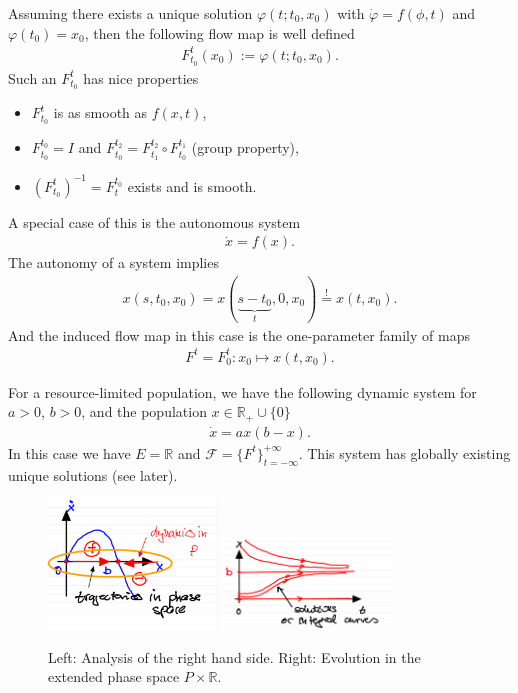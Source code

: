 \begin{enumerate}
	Assuming there exists a unique solution $\varphi(t; t_0, x_0)$ with $\dot{\varphi} = f(\phi,t)$ and $\varphi(t_0)= x_0$, then the following flow map is well defined
	\begin{align}
		\boxed{
		F_{t_0}^{t}(x_0) := \varphi(t; t_0, x_0).}
	\end{align}
	Such an $F_{t_0}^{t}$ has nice properties
	\begin{itemize}
		\item $F_{t_0}^{t}$ is as smooth as $f(x,t)$,
		\item $F_{t_0}^{t_0} = I$ and $F_{t_0}^{t_2} = F_{t_1}^{t_2} \circ F_{t_0}^{t_1}$ (group property),
		\item $\left(F_{t_0}^{t}\right)^{-1} = F_{t}^{t_0}$ exists and is smooth.
\end{itemize}
A special case of this is the autonomous system 
\begin{align}
	\boxed{\dot{x} = f(x).}	
\end{align}
The autonomy of a system implies
\begin{align}
	x(s,t_0, x_0) = x(\underbrace{s-t_0}_{t}, 0, x_0) \stackrel{!}{=} x(t,x_0).
\end{align}
And the induced flow map in this case is the one-parameter family of maps
\begin{align}
	\boxed{ F^{t} = F_{0}^{t}: x_0 \mapsto x(t,x_0).}
\end{align}
\end{enumerate}
\begin{ex}
	For a resource-limited population, we have the following dynamic system for $a> 0$, $b> 0$, and the population $x\in \mathbb{R}_+ \cup \{0\}$
	\begin{align}
		\dot{x} = ax(b-x).
	\end{align}
	In this case we have $E=\mathbb{R}$ and $\mathcal{F} = \{F^{t}\}_{t=-\infty }^{+\infty }$. This system has globally existing unique solutions (see later).	
	\begin{figure}[h]
		\centering
		\includegraphics[width=0.4\textwidth]{figures/intro/3RHS.png}	
		\hspace{0.05\textwidth}
		\includegraphics[width=0.4\textwidth]{figures/intro/4solutions.png}
		\caption{Left: Analysis of the right hand side. Right: Evolution in the extended phase space $P \times \mathbb{R}$.}
	\end{figure}

\end{ex}


